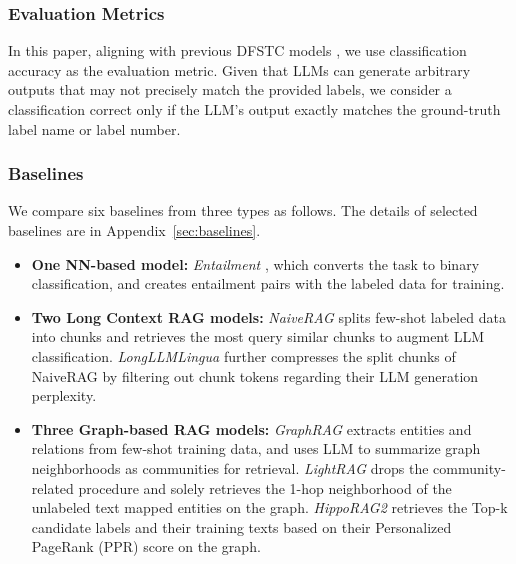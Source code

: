 \subsubsection{\textbf{Evaluation Metrics}}
In this paper, aligning with previous DFSTC models \cite{xia-etal-2021-incremental, meng2020text}, 
we use classification accuracy as the evaluation metric. 
Given that LLMs can generate arbitrary outputs that may not precisely match the provided labels, we consider a classification correct only if the LLM's output exactly matches the ground-truth label name or label number.




	
	

\subsubsection{\textbf{Baselines}}

	
	We compare six baselines from three types as follows.
	The details of selected baselines are in Appendix~\ref{sec:baselines}. 
	\begin{itemize}[leftmargin=*]
		\item 	 \textbf{One NN-based model: } \textit{Entailment} \cite{xia-etal-2021-incremental}, which converts the task to binary classification, and creates entailment pairs with the labeled data for training. 
		
		\item 	 \textbf{Two Long Context RAG models:  }
		\textit{NaiveRAG} \cite{gao2023retrieval} splits few-shot labeled data into chunks and retrieves the most query similar chunks to augment LLM classification.
		\textit{LongLLMLingua} \cite{jiang-etal-2024-longllmlingua} further compresses the split chunks of NaiveRAG by filtering out chunk tokens regarding their LLM generation perplexity.
		
		\item 	 \textbf{Three Graph-based RAG models: }
		\textit{GraphRAG} \cite{edge2024local} extracts entities and relations from few-shot training data, and uses LLM to summarize graph neighborhoods as communities for retrieval. 
		\textit{LightRAG} \cite{guo2024lightrag} drops the community-related procedure and solely retrieves the 1-hop neighborhood of the unlabeled text mapped entities on the graph.
		\textit{HippoRAG2} \cite{gutiérrez2025ragmemory} retrieves the Top-k candidate labels and their training texts based on their Personalized PageRank (PPR) score on the graph.
		
	\end{itemize}
	

